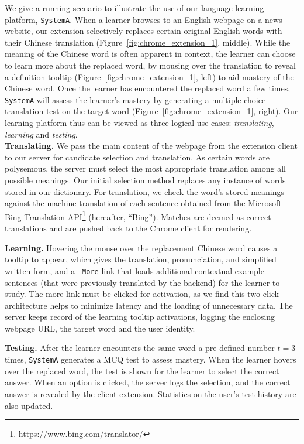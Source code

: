 \begin{CJK}{UTF8}{gbsn}
We give a running scenario to illustrate the use of our language
learning platform, {\tt SystemA}.  When a learner browses to an
English webpage on a news website, our extension selectively replaces
certain original English words with their Chinese translation
(Figure~\ref{fig:chrome_extension_1}, middle).  While the meaning of
the Chinese word is often apparent in context, the learner can choose
to learn more about the replaced word, by mousing over the translation
to reveal a definition tooltip (Figure~\ref{fig:chrome_extension_1},
left) to aid mastery of the Chinese word.  Once the learner has
encountered the replaced word a few times, {\tt SystemA} will assess
the learner's mastery by generating a multiple choice translation test
on the target word (Figure~\ref{fig:chrome_extension_1}, right). Our
learning platform thus can be viewed as three logical use cases:
{\it translating}, {\it learning} and {\it testing}. \\

{\bf Translating.}  We pass the main content of the webpage from the
extension client to our server for candidate selection and
translation.  As certain words are polysemous, the server must select
the most appropriate translation among all possible meanings. Our
initial selection method replaces any instance of words stored in our
dictionary. For translation, we check the word's stored meanings
against the machine translation of each sentence obtained from the
Microsoft Bing Translation API\footnote{\url{https://www.bing.com/translator/}} 
(hereafter, ``Bing'').  Matches are
deemed as correct translations and are pushed back to the Chrome
client for rendering.


{\bf Learning.} Hovering the mouse over the replacement Chinese word
causes a tooltip to appear, which gives the translation,
pronunciation, and simplified written form, and a {\tt
  More} link that loads additional contextual example sentences (that
were previously translated by the backend) for the learner to study.
The more link must be clicked for activation, as we find this
two-click architecture helps to minimize latency and the loading of
unnecessary data.  The server keeps record of the learning tooltip
activations, logging the enclosing webpage URL, the target word and
the user identity.

{\bf Testing.}  After the learner encounters the same word a
pre-defined number $t=3$ times, {\tt SystemA} generates a MCQ test
to assess mastery.  When the learner hovers over the replaced word,
the test is shown for the learner to select the correct answer. When
an option is clicked, the server logs the selection, and the correct
answer is revealed by the client extension.  Statistics on the user's
test history are also updated.


\end{CJK}
